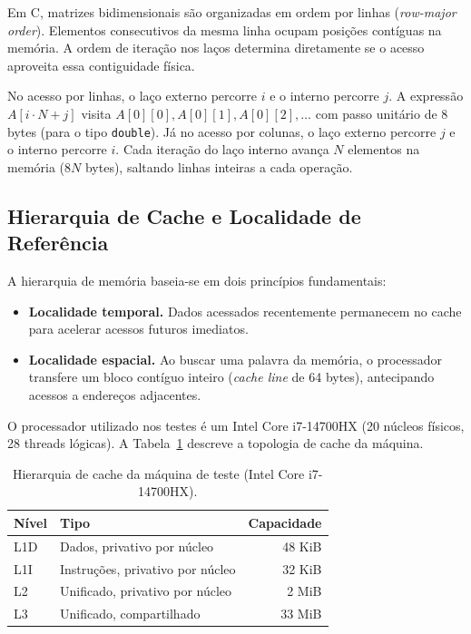 \documentclass[11pt,letterpaper]{article}
\begin{document}
Em C, matrizes bidimensionais são organizadas em ordem por linhas (\textit{row-major order}). Elementos consecutivos da mesma linha ocupam posições contíguas na memória. A ordem de iteração nos laços determina diretamente se o acesso aproveita essa contiguidade física.

No acesso por linhas, o laço externo percorre $i$ e o interno percorre $j$. A expressão $A[i \cdot N + j]$ visita $A[0][0], A[0][1], A[0][2], \ldots$ com passo unitário de 8 bytes (para o tipo \texttt{double}). Já no acesso por colunas, o laço externo percorre $j$ e o interno percorre $i$. Cada iteração do laço interno avança $N$ elementos na memória ($8N$ bytes), saltando linhas inteiras a cada operação.

\subsection{Hierarquia de Cache e Localidade de Referência}

A hierarquia de memória baseia-se em dois princípios fundamentais:
\begin{itemize}
    \item \textbf{Localidade temporal.} Dados acessados recentemente permanecem no cache para acelerar acessos futuros imediatos.
    \item \textbf{Localidade espacial.} Ao buscar uma palavra da memória, o processador transfere um bloco contíguo inteiro (\textit{cache line} de 64 bytes), antecipando acessos a endereços adjacentes.
\end{itemize}

O processador utilizado nos testes é um Intel Core i7-14700HX (20 núcleos físicos, 28 threads lógicas). A Tabela~\ref{tab:cache} descreve a topologia de cache da máquina.

\begin{table}[H]
\centering
\caption{Hierarquia de cache da máquina de teste (Intel Core i7-14700HX).}
\label{tab:cache}
\small
\begin{tabular}{@{}llr@{}}
\toprule
\textbf{Nível} & \textbf{Tipo} & \textbf{Capacidade} \\
\midrule
L1D & Dados, privativo por núcleo & 48 KiB \\
L1I & Instruções, privativo por núcleo & 32 KiB \\
L2  & Unificado, privativo por núcleo & 2 MiB \\
L3  & Unificado, compartilhado & 33 MiB \\
\bottomrule
\end{tabular}
\end{table}
\end{document}
